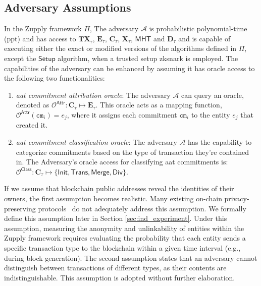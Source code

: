 \subsection{Adversary Assumptions}

In the Zupply framework $\Pi$, The adversary $\mathcal{A}$ is probabilistic polynomial-time (\gls{ppt}) and has access to $\mathbf{TX}_\tau$, $\mathbf{E}_\tau$, $\mathbf{C}_\tau$,  $\mathbf{X}_\tau$, $\mathsf{MHT}$ and $\mathbf{D}_\tau$ and is capable of executing either the exact or modified versions of the algorithms defined in $\Pi$, except the $\mathsf{Setup}$ algorithm, when a trusted setup \gls{zksnark} is employed. The capabilities of the adversary can be enhanced by assuming it has oracle access to the following two functionalities:

\begin{enumerate}
	\item \textit{\gls{aat} commitment attribution oracle}: The adversary $\mathcal{A}$ can query an oracle, denoted as $\mathcal{O}^\mathsf{Attr}: \mathbf{C}_\tau \mapsto \mathbf{E}_\tau$. This oracle acts as a mapping function, $\mathcal{O}^\mathsf{Attr}(\texttt{cm}_i) = e_j$, where it assigns each commitment $\texttt{cm}_i$ to the entity $e_j$ that created it. 
	
	\item \textit{\gls{aat} commitment classification oracle}: The adversary $\mathcal{A}$ has the capability to categorize commitments based on the type of transaction they're contained in. The Adversary's oracle access for classifying \gls{aat} commitments is:\\ $\mathcal{O}^\mathsf{Class}: \mathbf{C}_\tau \mapsto \{\textsf{Init}, \textsf{Trans}, \textsf{Merge}, \textsf{Div}\}$. 
\end{enumerate}

If we assume that blockchain public addresses reveal the identities of their owners, the first assumption becomes realistic. Many existing on-chain privacy-preserving protocols~\cite{altawy2019mesh,ZEXE,zkLedger2018,ZeeStar} do not adequately address this assumption. We formally define this assumption later in Section \ref{sec:ind_experiment}. Under this assumption, measuring the anonymity and unlinkability of entities within the Zupply framework requires evaluating the probability that each entity sends a specific transaction type to the blockchain within a given time interval (e.g., during block generation). The second assumption states that an adversary cannot distinguish between transactions of different types, as their contents are indistinguishable. This assumption is adopted without further elaboration. 


